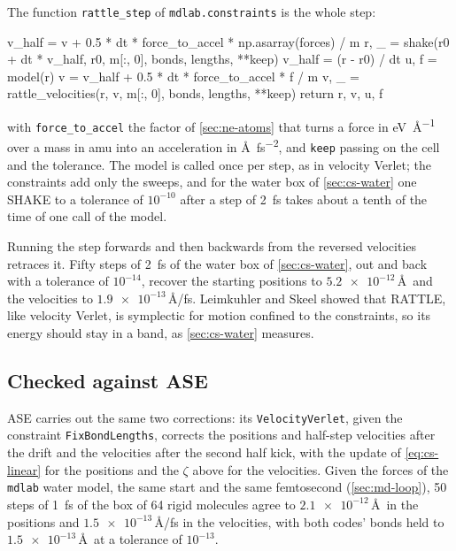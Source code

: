 The function \texttt{rattle\_step} of \texttt{mdlab.constraints} is the
whole step:
\begin{code}
    v_half = v + 0.5 * dt * force_to_accel * np.asarray(forces) / m
    r, _ = shake(r0 + dt * v_half, r0, m[:, 0], bonds, lengths, **keep)
    v_half = (r - r0) / dt
    u, f = model(r)
    v = v_half + 0.5 * dt * force_to_accel * f / m
    v, _ = rattle_velocities(r, v, m[:, 0], bonds, lengths, **keep)
    return r, v, u, f
\end{code}
\noindent with \texttt{force\_to\_accel} the factor of \cref{sec:ne-atoms}
that turns a force in \si{\electronvolt\per\angstrom} over a mass in amu
into an acceleration in \si{\angstrom\per\femto\second\squared}, and
\texttt{keep} passing on the cell and the tolerance. The model is called
once per step, as in velocity Verlet; the constraints add only the sweeps,
and for the water box of \cref{sec:cs-water} one SHAKE to a tolerance of
$10^{-10}$ after a step of \SI{2}{\femto\second} takes about a tenth of the
time of one call of the model.

Running the step forwards and then backwards from the reversed velocities
retraces it. Fifty steps of \SI{2}{\femto\second} of the water box of
\cref{sec:cs-water}, out and back with a tolerance of $10^{-14}$, recover
the starting positions to $\num{5.2e-12}$\,\AA\ and the velocities to
$\num{1.9e-13}$\,\AA/fs. Leimkuhler and Skeel showed that RATTLE, like
velocity Verlet, is symplectic for motion confined to the
constraints\cite{LeimkuhlerSkeel1994}, so its energy should stay in a
band, as \cref{sec:cs-water} measures.

\subsection*{Checked against ASE}

ASE carries out the same two corrections: its \texttt{VelocityVerlet},
given the constraint \texttt{FixBondLengths}, corrects the positions and
half-step velocities after the drift and the velocities after the second
half kick, with the update of \cref{eq:cs-linear} for the positions and
the $\zeta$ above for the velocities. Given the forces of the
\texttt{mdlab} water model, the same start and the same femtosecond
(\cref{sec:md-loop}), 50 steps of \SI{1}{\femto\second} of the box of 64
rigid molecules agree to $\num{2.1e-12}$\,\AA\ in the positions and
$\num{1.5e-13}$\,\AA/fs in the velocities, with both codes' bonds held to
$\num{1.5e-13}$\,\AA\ at a tolerance of $10^{-13}$.

